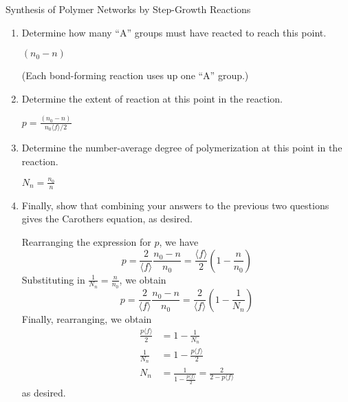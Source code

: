 \begin{activity}[extension]{Synthesis of Polymer Networks by Step-Growth Reactions}
\begin{exercises}
\begin{enumerate}
			\item Determine how many ``A'' groups must have reacted to reach this point.
			
				\begin{solution}{}
					$(n_0-n)$ 
					
					(Each bond-forming reaction uses up one ``A'' group.)
				\end{solution}
				
			\item Determine the extent of reaction at this point in the reaction.
			
				\begin{solution}{}
					$p = \frac{(n_0-n)}{n_0\langle f \rangle/2}$
				\end{solution}
				
			\item Determine the number-average degree of polymerization at this point in the reaction.
			
				\begin{solution}{}
					$N_n = \frac{n_0}{n}$
				\end{solution}
				
			\item Finally, show that combining your answers to the previous two questions gives the Carothers equation, as desired.
			
				\begin{solution}{}
					Rearranging the expression for $p$, we have
					\begin{equation*}
						p = \frac{2}{\langle f \rangle}\frac{n_0 - n}{n_0} = \frac{\langle f \rangle}{2}\left(1 - \frac{n}{n_0}\right)
					\end{equation*}
					Substituting in $\frac{1}{N_n} = \frac{n}{n_0}$, we obtain
					\begin{equation*}
						p = \frac{2}{\langle f \rangle}\frac{n_0 - n}{n_0} = \frac{2}{\langle f \rangle}\left(1 - \frac{1}{N_n}\right)
					\end{equation*}
					Finally, rearranging, we obtain
					\begin{align*}
						\frac{p\langle f \rangle}{2} &= 1-\frac{1}{N_n} \\
						\frac{1}{N_n} &= 1-\frac{p\langle f \rangle}{2} \\
						N_n &= \frac{1}{1-\frac{p\langle f \rangle}{2}} = \frac{2}{2-p\langle f \rangle}
					\end{align*}
					as desired.
				\end{solution}
		\end{enumerate}
	
\end{exercises}


%
%	


	
\end{activity}